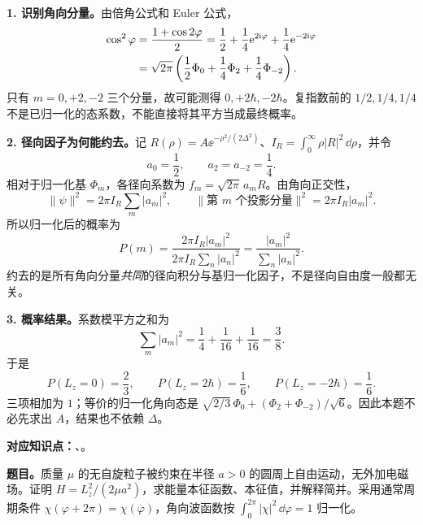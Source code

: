 \begin{checkedsolution}
\textbf{1. 识别角向分量。}由倍角公式和 Euler 公式，
\begin{align}
  \cos^2\varphi
  &=\frac{1+\cos2\varphi}{2}
   =\frac12+\frac14\mathrm{e}^{2\mathrm{i}\varphi}+\frac14\mathrm{e}^{-2\mathrm{i}\varphi}\notag\\
  &=\sqrt{2\pi}\left(\frac12\Phi_0
                   +\frac14\Phi_2+\frac14\Phi_{-2}\right).
\end{align}
只有 $m=0,+2,-2$ 三个分量，故可能测得 $0,+2\hbar,-2\hbar$。复指数前的 $1/2,1/4,1/4$ 不是已归一化的态系数，不能直接将其平方当成最终概率。

\textbf{2. 径向因子为何能约去。}记 $R(\rho)=A\ee^{-\rho^2/(2\Delta^2)}$、$I_R=\int_0^\infty\rho|R|^2\,\dd\rho$，并令
\begin{equation}
  a_0=\frac12,\qquad a_2=a_{-2}=\frac14.
\end{equation}
相对于归一化基 $\Phi_m$，各径向系数为 $f_m=\sqrt{2\pi}\,a_mR$。由角向正交性，
\begin{equation}
  \|\psi\|^2=2\pi I_R\sum_m|a_m|^2,\qquad
  \|\text{第 }m\text{ 个投影分量}\|^2=2\pi I_R|a_m|^2.
\end{equation}
所以归一化后的概率为
\begin{equation}
  P(m)=\frac{2\pi I_R|a_m|^2}
             {2\pi I_R\sum_n|a_n|^2}
      =\frac{|a_m|^2}{\sum_n|a_n|^2}.
\end{equation}
约去的是所有角向分量\emph{共同}的径向积分与基归一化因子，不是径向自由度一般都无关。

\textbf{3. 概率结果。}系数模平方之和为
\begin{equation}
  \sum_m|a_m|^2=\frac14+\frac1{16}+\frac1{16}=\frac38.
\end{equation}
于是
\begin{equation}
  \boxed{P(L_z=0)=\frac23,\qquad
         P(L_z=2\hbar)=\frac16,\qquad
         P(L_z=-2\hbar)=\frac16.}
\end{equation}
三项相加为 $1$；等价的归一化角向态是
$\sqrt{2/3}\,\Phi_0+(\Phi_2+\Phi_{-2})/\sqrt6$。因此本题不必先求出 $A$，结果也不依赖 $\Delta$。
\end{checkedsolution}

\textbf{对应知识点：}、。

\textbf{题目。}质量 $\mu$ 的无自旋粒子被约束在半径 $a>0$ 的圆周上自由运动，无外加电磁场。证明 $H=L_z^2/(2\mu a^2)$，求能量本征函数、本征值，并解释简并。采用通常周期条件 $\chi(\varphi+2\pi)=\chi(\varphi)$，角向波函数按 $\int_0^{2\pi}|\chi|^2\,\dd\varphi=1$ 归一化。

